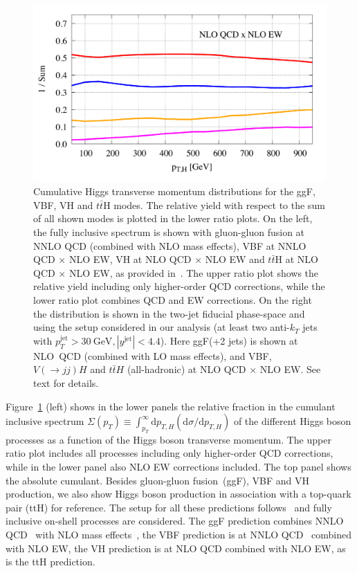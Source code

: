 \documentclass[10pt,prd,fleqn,superscriptaddress,notitlepage,nofootinbib,preprintnumbers,nobalancelastpage]{revtex4-1}
\newcommand{\VBF}{VBF\xspace}
\newcommand{\VH}{VH\xspace}
\newcommand{\ttH}{ttH\xspace}
\begin{document}
\begin{figure}[t!]
\includegraphics[width=.45\textwidth]{figures/pTH_fid-ratio-QCDEW.pdf}
\caption{Cumulative Higgs transverse momentum distributions for the ggF, \VBF, \VH and $t\bar{t}$H modes. The relative yield with respect to the sum of all shown modes is plotted in the lower ratio plots. On the left, the fully inclusive spectrum is shown with gluon-gluon fusion at NNLO QCD (combined with NLO mass effects), \VBF at NNLO QCD $\times$ NLO EW, \VH at NLO QCD $\times$ NLO EW and $t\bar{t}$H at NLO QCD $\times$ NLO EW, as provided in~\cite{Becker:2020rjp}. The upper ratio plot shows the relative yield including only higher-order QCD corrections, while the lower ratio plot combines QCD and EW corrections. 
On the right the
distribution is shown in the two-jet fiducial phase-space and using the setup considered in our analysis (at least two anti-$k_T$ jets with $p_T^{\text{jet}} > 30\ \text{GeV},  |y^{\text{jet}}|<4.4$). Here ggF(+2 jets) is shown at NLO~QCD (combined with LO mass effects), and \VBF, $V(\to jj)H$ and $t\bar{t}H$ (all-hadronic) at NLO QCD $\times$ NLO EW. See text for details.
}
\label{fig:rel_fraction}
\end{figure}
Figure~\ref{fig:rel_fraction} (left) shows in the lower panels the relative fraction in the cumulant inclusive spectrum
$\Sigma(p_T) \equiv \int_{p_T}^\infty \mathrm{d}p_{T,H} (\mathrm{d}\sigma / \mathrm{d}p_{T,H})$
of the different Higgs boson processes as a function of the Higgs boson transverse momentum. The upper ratio plot includes all processes including only higher-order QCD corrections, while in the lower panel also NLO EW corrections included. The top panel shows the absolute cumulant.
Besides gluon-gluon fusion~(ggF), \VBF and \VH production,  we also show Higgs boson production in association with a top-quark pair (\ttH) for reference. The setup for all these predictions follows~\cite{Becker:2020rjp} and fully inclusive on-shell processes are considered.
 The ggF prediction combines NNLO QCD~\cite{Chen:2014gva,Chen:2016zka} with NLO mass effects~\cite{Lindert:2018iug,Jones:2018hbb}, the \VBF prediction is at NNLO QCD~\cite{Cruz-Martinez:2018rod} combined with NLO EW, the \VH prediction is at NLO QCD combined with NLO EW, as is the \ttH prediction.
\end{document}
